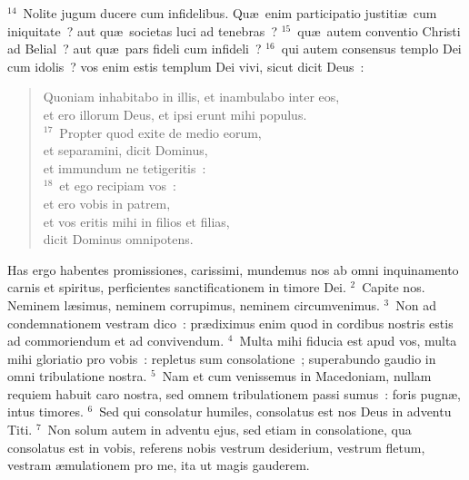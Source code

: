 ${}^{14}$~Nolite jugum ducere cum infidelibus. Qu\ae\ enim participatio justiti\ae\ cum iniquitate~? aut qu\ae\ societas luci ad tenebras~?
${}^{15}$~qu\ae\ autem conventio Christi ad Belial~? aut qu\ae\ pars fideli cum infideli~?
${}^{16}$~qui autem consensus templo Dei cum idolis~? vos enim estis templum Dei vivi, sicut dicit Deus~: \begin{flushleft}\begin{verse}Quoniam inhabitabo in illis, et inambulabo inter eos,\\ et ero illorum Deus, et ipsi erunt mihi populus.\\
${}^{17}$~Propter quod exite de medio eorum,\\ et separamini, dicit Dominus,\\ et immundum ne tetigeritis~:\\
${}^{18}$~et ego recipiam vos~:\\ et ero vobis in patrem,\\ et vos eritis mihi in filios et filias,\\ dicit Dominus omnipotens.\end{verse}\end{flushleft}



\bchapter
\lettrine[lines=3,image=true,loversize=0.05,lraise=-0.03]{H}{}as ergo habentes promissiones, carissimi, mundemus nos ab omni inquinamento carnis et spiritus, perficientes sanctificationem in timore Dei.
${}^{2}$~Capite nos. Neminem l\ae simus, neminem corrupimus, neminem circumvenimus.
${}^{3}$~Non ad condemnationem vestram dico~: pr\ae diximus enim quod in cordibus nostris estis ad commoriendum et ad convivendum.
${}^{4}$~Multa mihi fiducia est apud vos, multa mihi gloriatio pro vobis~: repletus sum consolatione~; superabundo gaudio in omni tribulatione nostra.
${}^{5}$~Nam et cum venissemus in Macedoniam, nullam requiem habuit caro nostra, sed omnem tribulationem passi sumus~: foris pugn\ae , intus timores.
${}^{6}$~Sed qui consolatur humiles, consolatus est nos Deus in adventu Titi.
${}^{7}$~Non solum autem in adventu ejus, sed etiam in consolatione, qua consolatus est in vobis, referens nobis vestrum desiderium, vestrum fletum, vestram \ae mulationem pro me, ita ut magis gauderem.



